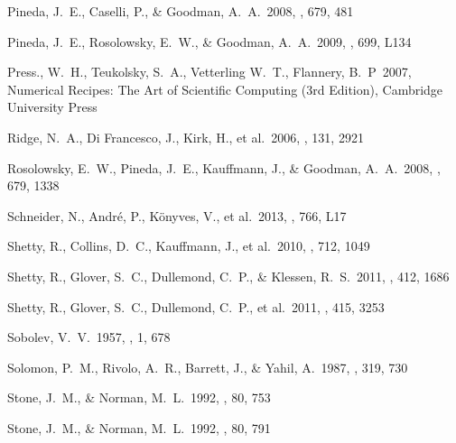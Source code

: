 \begin{thebibliography}{60}
 Pineda, J.~E., Caselli,  P., \& Goodman, A.~A.\ 2008, \apj, 679, 481    

 Pineda, J.~E.,  Rosolowsky, E.~W., \& Goodman, A.~A.\ 2009, \apjl, 699, L134    

 Press., W.~H., Teukolsky, S.~A., Vetterling W.~T., Flannery, B.~P\ 2007, Numerical Recipes: The Art of Scientific Computing (3rd Edition), Cambridge University Press

 Ridge, N.~A., Di  Francesco, J., Kirk, H., et al.\ 2006, \aj, 131, 2921    

 Rosolowsky, E.~W.,  Pineda, J.~E., Kauffmann, J., \& Goodman, A.~A.\ 2008, \apj, 679, 1338    

 Schneider, N.,  Andr{\'e}, P., K{\"o}nyves, V., et al.\ 2013, \apjl, 766, L17    

 Shetty, R., Collins,  D.~C., Kauffmann, J., et al.\ 2010, \apj, 712, 1049    

 Shetty, R., Glover,  S.~C., Dullemond, C.~P., \& Klessen, R.~S.\ 2011, \mnras, 412, 1686

 Shetty, R., Glover,  S.~C., Dullemond, C.~P., et al.\ 2011, \mnras, 415, 3253

 Sobolev, V.~V.\ 1957, \sovast,  1, 678    

 Solomon, P.~M., Rivolo,  A.~R., Barrett, J., \& Yahil, A.\ 1987, \apj, 319, 730    

 Stone, J.~M., \& Norman, M.~L.\ 1992, \apjs, 80, 753

 Stone, J.~M., \& Norman, M.~L.\ 1992, \apjs, 80, 791


\end{thebibliography}
